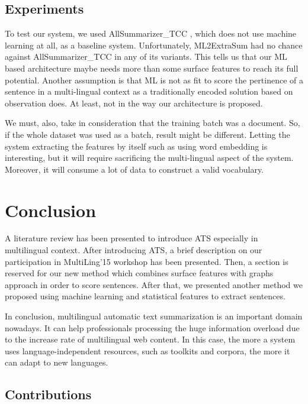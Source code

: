 \documentclass[12pt, oneside, a4paper]{article}
\begin{document}
\subsection{Experiments}

To test our system, we used AllSummarizer\_TCC \citep{13-aries-al,15-aries-al}, which does not use machine learning at all, as a baseline system. 
Unfortunately, ML2ExtraSum had no chance against AllSummarizer\_TCC in any of its variants. 
This tells us that our ML based architecture maybe needs more than some surface features to reach its full potential. 
Another assumption is that ML is not as fit to score the pertinence of a sentence in a multi-lingual context as a traditionally encoded solution based on observation does. 
At least, not in the way our architecture is proposed. 

We must, also, take in consideration that the training batch was a document. 
So, if the whole dataset was used as a batch, result might be different.
Letting the system extracting the features by itself such as using word embedding is interesting, but it will require sacrificing the multi-lingual aspect of the system. 
Moreover, it will consume a lot of data to construct a valid vocabulary. 


\section{Conclusion}

A literature review has been presented to introduce ATS especially in multilingual context.
After introducing ATS, a brief description on our participation in MultiLing'15 workshop has been presented. 
Then, a section is reserved for our new method which combines surface features with graphs approach in order to score sentences. 
After that, we presented another method we proposed using machine learning and statistical features to extract sentences.

In conclusion, multilingual automatic text summarization is an important domain nowadays.
It can help professionals processing the huge information overload due to the increase rate of multilingual web content.
In this case, the more a system uses language-independent resources, such as toolkits and corpora, the more it can adapt to new languages. 

\subsection{Contributions}
\end{document}
